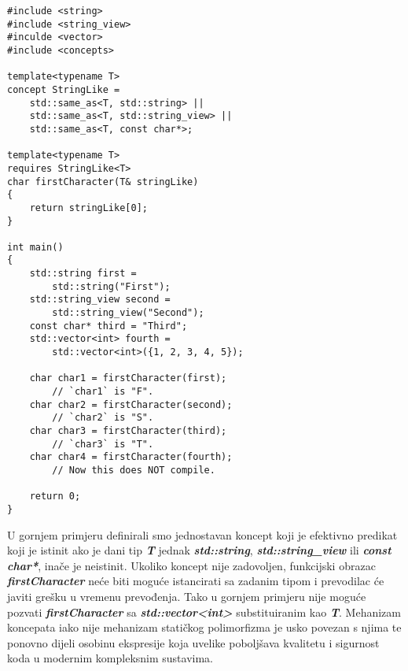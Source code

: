 \lstset{language=C++, tabsize=2, frame=single, breaklines=true}
\begin{lstlisting}
#include <string>
#include <string_view>
#inculde <vector>
#include <concepts>

template<typename T>
concept StringLike = 
    std::same_as<T, std::string> || 
    std::same_as<T, std::string_view> || 
    std::same_as<T, const char*>;

template<typename T>
requires StringLike<T>
char firstCharacter(T& stringLike)
{
    return stringLike[0];
}

int main()
{
    std::string first = 
        std::string("First");
    std::string_view second = 
        std::string_view("Second");
    const char* third = "Third";
    std::vector<int> fourth = 
        std::vector<int>({1, 2, 3, 4, 5});

    char char1 = firstCharacter(first);  
        // `char1` is "F".
    char char2 = firstCharacter(second); 
        // `char2` is "S".
    char char3 = firstCharacter(third); 
        // `char3` is "T".
    char char4 = firstCharacter(fourth); 
        // Now this does NOT compile.

    return 0; 
}
\end{lstlisting}
U gornjem primjeru definirali smo jednostavan koncept koji je efektivno predikat koji je istinit ako je dani tip \textbf{\textit{T}} jednak \textbf{\textit{std::string}}, \textbf{\textit{std::string\_view}} ili \textbf{\textit{const char*}}, inače je neistinit. Ukoliko koncept nije zadovoljen, funkcijski obrazac \textbf{\textit{firstCharacter}} neće biti moguće istancirati sa zadanim tipom i prevodilac će javiti grešku u vremenu prevođenja. Tako u gornjem primjeru nije moguće pozvati \textbf{\textit{firstCharacter}} sa \textbf{\textit{std::vector<int>}} substituiranim kao \textbf{\textit{T}}. Mehanizam koncepata iako nije mehanizam statičkog polimorfizma je usko povezan s njima te ponovno dijeli osobinu ekspresije koja uvelike poboljšava kvalitetu i sigurnost koda u modernim kompleksnim sustavima. 

